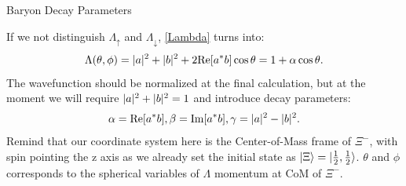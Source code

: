 \documentclass[
	xcolor=dvipsnames,
	10pt, 
	]{beamer}
\begin{document}
\begin{frame}{Baryon Decay Parameters}
	\begin{block}{}
		If we not distinguish $\Lambda_{\uparrow}$ and $\Lambda_{\downarrow}$, \eqref{Lambda} turns into:
		\begin{align}
			\Lambda(\theta,\phi)=|a|^2+|b|^2+2\mathrm{Re}[a^*b]\cos\theta = 1+\alpha\cos\theta.
		\end{align}
		The wavefunction should be normalized at the final calculation, but at the moment we will require $|a|^2+|b|^2=1$ and introduce decay parameters:
		\begin{align}
			\alpha= \mathrm{Re}[a^*b], \beta = \mathrm{Im}[a^*b],\gamma = |a|^2-|b|^2.
		\end{align}
		Remind that our coordinate system here is the Center-of-Mass frame of $\Xi^-$, with spin pointing the z axis as we already set the initial state as $|\Xi\rangle=|\frac{1}{2},\frac{1}{2}\rangle$. $\theta$ and $\phi$ corresponds to the spherical variables of $\Lambda$ momentum at CoM of $\Xi^-$.
	\end{block}
\end{frame}
\end{document}
